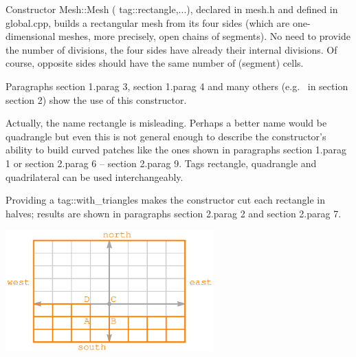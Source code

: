 {Constructor {\codett Mesh::Mesh ( tag::rectangle,...)}, declared in {\codett mesh.h} and defined in
{\codett global.cpp}, builds a rectangular mesh from its
four sides (which are one-dimensional meshes, more precisely, open chains of segments).
No need to provide the number of divisions, the four sides have already their internal divisions.
Of course, opposite sides should have the same number of (segment) cells.

Paragraphs \numb section 1.\numb parag 3, \numb section 1.\numb parag 4 and many others (e.g.%
\ in section \numb section 2) show the use of this constructor.

Actually, the name {\codett rectangle} is misleading.
Perhaps a better name would be {\codett quadrangle} but even this is not general enough to
describe the constructor's ability to build curved patches like the ones shown in paragraphs
\numb section 1.\numb parag 1 or \numb section 2.\numb parag 6 -- \numb section 2.\numb parag 9.
Tags {\codett rectangle}, {\codett quadrangle} and {\codett quadrilateral} can be used
interchangeably.

Providing a {\codett tag::with\_triangles} makes the constructor cut each rectangle in halves;
results are shown in paragraphs \numb section 2.\numb parag 2 and \numb section 2.\numb parag 7.

{ 
\centerline{\includegraphics[width=80mm]{fig-rectangle.eps}} }

}
